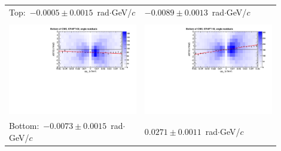 \documentclass[compress]{beamer}
\begin{document}
\begin{frame}
\begin{tabular}{p{0.45\linewidth} p{0.45\linewidth}}
\small \mbox{Top: $-0.0005 \pm 0.0015$~rad$\cdot$GeV/$c$\hspace{-1 cm}} & \small \hfill \mbox{$-0.0089 \pm 0.0013$~rad$\cdot$GeV/$c$} \\
& \\
\includegraphics[width=\linewidth]{bfield_dxdz_craft09_bottom.pdf} & \includegraphics[width=\linewidth]{bfield_dxdz_craft10_bottom.pdf} \\
\small \mbox{Bottom: $-0.0073 \pm 0.0015$~rad$\cdot$GeV/$c$\hspace{-1 cm}} & \small \hfill \mbox{$0.0271 \pm 0.0011$~rad$\cdot$GeV/$c$} \\
\end{tabular}
\end{frame}
\end{document}
